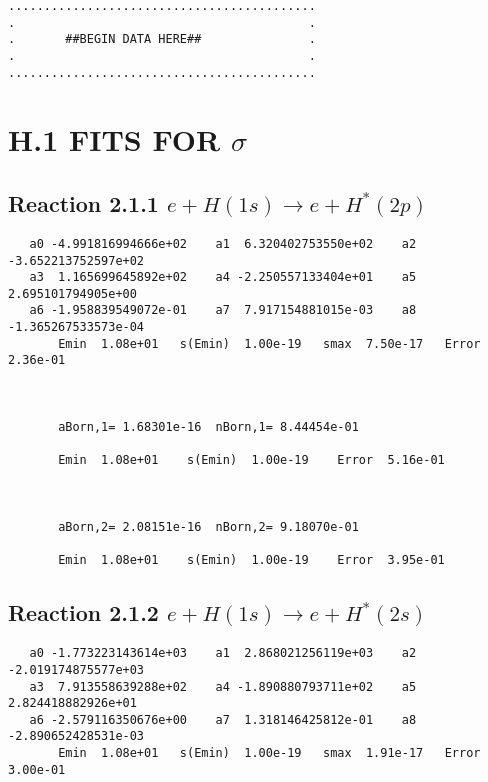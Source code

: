 \documentclass[12pt]{article}
\begin{document}
\bigskip
\begin{small}\begin{verbatim}
...........................................
.                                         .
.       ##BEGIN DATA HERE##               .
.                                         .
...........................................
\end{verbatim}\end{small}
\newpage


\section{H.1  FITS FOR $\sigma$}

\subsection{
Reaction 2.1.1 $   e + H(1s) \rightarrow e + H^*(2p) $}


\begin{small}\begin{verbatim}
   a0 -4.991816994666e+02    a1  6.320402753550e+02    a2 -3.652213752597e+02
   a3  1.165699645892e+02    a4 -2.250557133404e+01    a5  2.695101794905e+00
   a6 -1.958839549072e-01    a7  7.917154881015e-03    a8 -1.365267533573e-04
       Emin  1.08e+01   s(Emin)  1.00e-19   smax  7.50e-17   Error  2.36e-01



       aBorn,1= 1.68301e-16  nBorn,1= 8.44454e-01

       Emin  1.08e+01    s(Emin)  1.00e-19    Error  5.16e-01



       aBorn,2= 2.08151e-16  nBorn,2= 9.18070e-01

       Emin  1.08e+01    s(Emin)  1.00e-19    Error  3.95e-01
\end{verbatim}\end{small}


\newpage
\subsection{
Reaction 2.1.2 $   e + H(1s) \rightarrow e + H^*(2s) $}

\begin{small}\begin{verbatim}
   a0 -1.773223143614e+03    a1  2.868021256119e+03    a2 -2.019174875577e+03
   a3  7.913558639288e+02    a4 -1.890880793711e+02    a5  2.824418882926e+01
   a6 -2.579116350676e+00    a7  1.318146425812e-01    a8 -2.890652428531e-03
       Emin  1.08e+01   s(Emin)  1.00e-19   smax  1.91e-17   Error  3.00e-01
\end{verbatim}\end{small}
\end{document}
